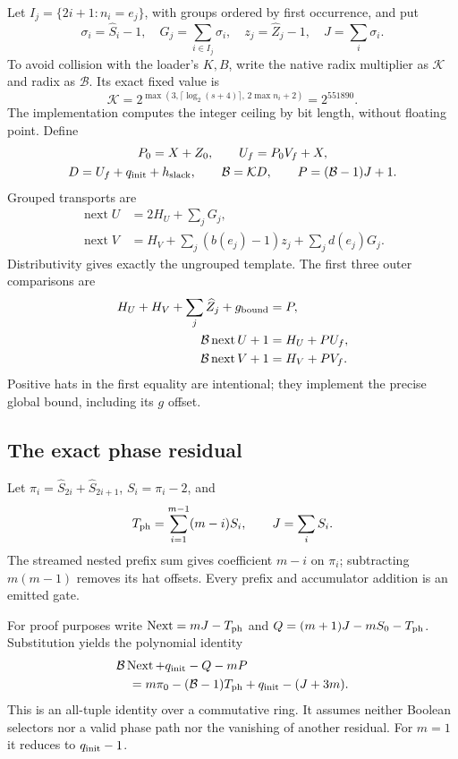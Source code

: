 \documentclass[11pt,letterpaper]{article}
\theoremstyle{definition}\newtheorem{definition}[theorem]{Definition}
\theoremstyle{remark}\newtheorem{remark}[theorem]{Remark}
\begin{document}
Let $I_j=\{2i+1:n_i=e_j\}$, with groups ordered by first occurrence, and put
\[
 \sigma_i=\widehat S_i-1,\quad G_j=\sum_{i\in I_j}\sigma_i,\quad
 z_j=\widehat Z_j-1,\quad J=\sum_i\sigma_i.
\]
To avoid collision with the loader's $K,B$, write the native radix multiplier as $\mathcal K$ and radix as $\mathcal B$. Its exact fixed value is
\[
 \mathcal K=2^{\max(3,\lceil\log_2(s+4)\rceil,\,2\max n_i+2)}=2^{551890}.
\]
The implementation computes the integer ceiling by bit length, without floating point. Define
\begin{gather*}
 P_0=X+Z_0,\qquad U_f=P_0V_f+X,\\
 D=U_f+q_{\rm init}+h_{\rm slack},\qquad\mathcal B=\mathcal K D,
 \qquad P=(\mathcal B-1)J+1.
\end{gather*}
Grouped transports are
\begin{align*}
 \operatorname{next}U&=2H_U+\sum_jG_j,\\
 \operatorname{next}V&=H_V+\sum_j(b(e_j)-1)z_j+\sum_jd(e_j)G_j.
\end{align*}
Distributivity gives exactly the ungrouped template. The first three outer comparisons are
\begin{align*}
 H_U+H_V+\sum_j\widehat Z_j+g_{\rm bound}&=P,\\
 \mathcal B\operatorname{next}U+1&=H_U+PU_f,\\
 \mathcal B\operatorname{next}V+1&=H_V+PV_f.
\end{align*}
Positive hats in the first equality are intentional; they implement the precise global bound, including its $g$ offset.

\subsection{The exact phase residual}
Let $\pi_i=\widehat S_{2i}+\widehat S_{2i+1}$, $S_i=\pi_i-2$, and
\[
 T_{\rm ph}=\sum_{i=1}^{m-1}(m-i)S_i,\qquad J=\sum_iS_i.
\]
The streamed nested prefix sum gives coefficient $m-i$ on $\pi_i$; subtracting $m(m-1)$ removes its hat offsets. Every prefix and accumulator addition is an emitted gate.

For proof purposes write $\operatorname{Next}=mJ-T_{\rm ph}$ and
$Q=(m+1)J-mS_0-T_{\rm ph}$. Substitution yields the polynomial identity
\begin{align*}
 &\mathcal B\operatorname{Next}+q_{\rm init}-Q-mP\\
 &\hspace{1em}=m\pi_0-(\mathcal B-1)T_{\rm ph}+q_{\rm init}-(J+3m).
\end{align*}
This is an all-tuple identity over a commutative ring. It assumes neither Boolean selectors nor a valid phase path nor the vanishing of another residual. For $m=1$ it reduces to $q_{\rm init}-1$.
\end{document}
